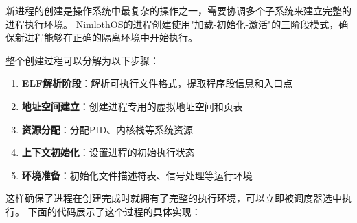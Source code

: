 新进程的创建是操作系统中最复杂的操作之一，需要协调多个子系统来建立完整的进程执行环境。
NimlothOS的进程创建使用"加载-初始化-激活"的三阶段模式，确保新进程能够在正确的隔离环境中开始执行。

整个创建过程可以分解为以下步骤：
\begin{enumerate}
    \item \textbf{ELF解析阶段}：解析可执行文件格式，提取程序段信息和入口点
    \item \textbf{地址空间建立}：创建进程专用的虚拟地址空间和页表
    \item \textbf{资源分配}：分配PID、内核栈等系统资源
    \item \textbf{上下文初始化}：设置进程的初始执行状态
    \item \textbf{环境准备}：初始化文件描述符表、信号处理等运行环境
\end{enumerate}

这样确保了进程在创建完成时就拥有了完整的执行环境，可以立即被调度器选中执行。
下面的代码展示了这个过程的具体实现：

